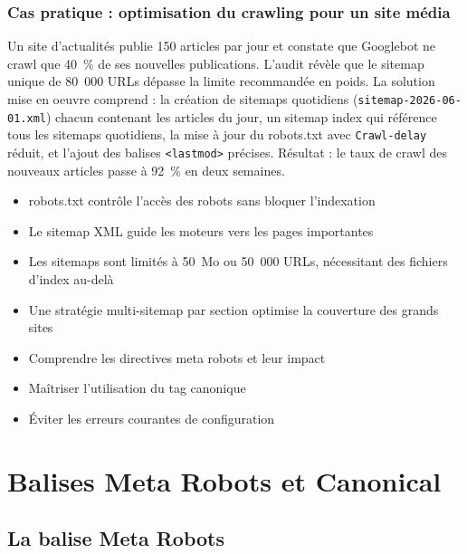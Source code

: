 \documentclass[12pt,a4paper,twoside]{report}
\newcommand{\level}[1]{\medskip\bigskip}
\begin{document}
\subsection{Cas pratique : optimisation du crawling pour un site média}

Un site d'actualités publie 150 articles par jour et constate que Googlebot ne crawl que 40~\% de ses nouvelles publications. L'audit révèle que le sitemap unique de 80~000 URLs dépasse la limite recommandée en poids. La solution mise en oeuvre comprend : la création de sitemaps quotidiens (\texttt{sitemap-2026-06-01.xml}) chacun contenant les articles du jour, un sitemap index qui référence tous les sitemaps quotidiens, la mise à jour du robots.txt avec \texttt{Crawl-delay} réduit, et l'ajout des balises \texttt{<lastmod>} précises. Résultat : le taux de crawl des nouveaux articles passe à 92~\% en deux semaines.

\begin{takeaways}
\begin{itemize}
    \item robots.txt contrôle l'accès des robots sans bloquer l'indexation
    \item Le sitemap XML guide les moteurs vers les pages importantes
    \item Les sitemaps sont limités à 50~Mo ou 50~000 URLs, nécessitant des fichiers d'index au-delà
    \item Une stratégie multi-sitemap par section optimise la couverture des grands sites
\end{itemize}
\end{takeaways}

\level{2}
\begin{objectives}
\begin{itemize}
    \item Comprendre les directives meta robots et leur impact
    \item Maîtriser l'utilisation du tag canonique
    \item Éviter les erreurs courantes de configuration
\end{itemize}
\end{objectives}

\chapter{Balises Meta Robots et Canonical}
\label{ch:balises}

\section{La balise Meta Robots}
\end{document}
